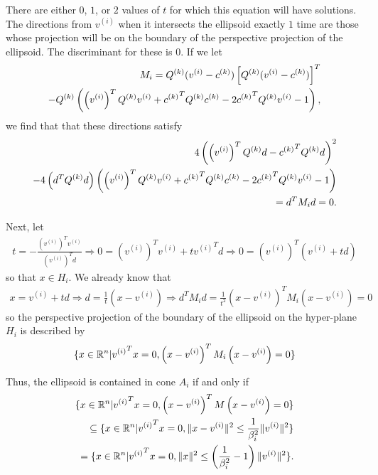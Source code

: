 There are either $0$, $1$, or $2$ values of $t$ for which this equation will have solutions.
The directions from $v^{(i)}$ when it intersects the ellipsoid exactly $1$ time are those whose projection will be on the boundary of the perspective projection of the ellipsoid.
The discriminant for these is $0$.
If we let
\begin{align*}
M_i = 
{Q^{(k)}} (v^{(i)} - {c^{(k)}} )\left[{Q^{(k)}} (v^{(i)} - {c^{(k)}} )\right]^T \\
- {Q^{(k)}}  \left(\left(v^{(i)}\right)^T {Q^{(k)}}  v^{(i)} + {c^{(k)}} ^T {Q^{(k)}}  {c^{(k)}}  - 2 {c^{(k)}} ^T {Q^{(k)}}  v^{(i)} - 1\right),
\end{align*}
we find that that these directions satisfy
\begin{align*}
4\left(\left(v^{(i)}\right)^T {Q^{(k)}}  d - {c^{(k)}} ^T{Q^{(k)}} d\right)^2 \\
- 4 \left(d^T{Q^{(k)}} d\right) \left(\left(v^{(i)}\right)^T {Q^{(k)}}  v^{(i)} + {c^{(k)}} ^T {Q^{(k)}}  {c^{(k)}}  - 2 {c^{(k)}} ^T {Q^{(k)}}  v^{(i)} - 1\right) \\
= d^TM_id = 0.
\end{align*}


Next, let
\begin{align*}
t = -\frac {\left(v^{(i)}\right)^T v^{(i)}}{\left(v^{(i)}\right)^T d } \Longrightarrow
0 = \left(v^{(i)}\right)^T v^{(i)} + t {v^{(i)}}^T d \Longrightarrow
0 = \left(v^{(i)}\right)^T \left(v^{(i)} + t d\right)
\end{align*}
so that $x \in H_i$.
We already know that
\begin{align*}
x = v^{(i)} + t d \Longrightarrow
d = \frac 1 t \left(x - v^{(i)}\right)
\Longrightarrow d^TM_id = \frac 1 {t^2} \left(x - v^{(i)}\right)^TM_i\left(x - v^{(i)}\right) = 0
\end{align*}
so the perspective projection of the boundary of the ellipsoid on the hyper-plane $H_i$ is described by
\begin{align*}
\{x \in \mathbb R^n | {v^{(i)}}^Tx = 0, \left(x - v^{(i)}\right)^TM_i\left(x - v^{(i)}\right) = 0\}
\end{align*}

Thus, the ellipsoid is contained in cone $A_i$ if and only if
\begin{align*}
\{x \in \mathbb R^n | {v^{(i)}}^Tx = 0, \left(x - v^{(i)}\right)^TM\left(x - v^{(i)}\right) = 0\} \\
\subseteq \{x \in \mathbb R^n | {v^{(i)}}^Tx = 0, \|x - v^{(i)}\|^2 \le \frac 1 {\beta_i^2}\|v^{(i)}\|^2 \} \\
= \{x \in \mathbb R^n | {v^{(i)}}^Tx = 0, \|x\|^2 \le \left(\frac 1 {\beta_i^2} - 1\right)\|v^{(i)}\|^2 \}.
\end{align*}

